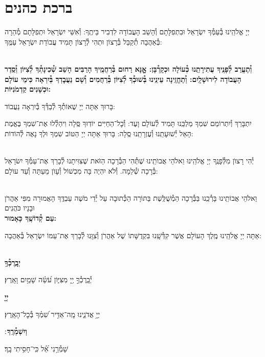 \documentclass[twoside, openany, parskip=half, 11pt]{book}
\begin{document}
\sepline

\clearpage

\vspace{-1\baselineskip}
\section[ברכת כהנים]{ ברכת כהנים ‎}
\label{birkaskohanim}

יְיָ אֱלֹהֵֽינוּ בְּ֯עַמְּ֯ךָ יִשְׂרָאֵל וּבִתְפִלָּתָם וְ֯הָשֵׁב הָעֲבוֹדָה לִדְבִיר בֵּיתֶֽךָ: וְ֯אִשֵּׁי יִשְׂרָאֵל וּתְפִלָּתָם מְ֯הֵרָה בְּ֯אַהֲבָה תְ֯קַבֵּל בְּ֯רָצוֹן וּתְהִי לְ֯רָצוֹן תָּמִיד עֲבוֹדַת יִשְׂרָאֵל עַמֶּֽךָ:

\chazzanvkahal \\
\textbf{
וְ֯תֶעֱרַב לְ֯פָנֶֽיךָ עֲתִירָתֵֽנוּ כְּ֯עוֹלָה וּכְקָרְ֯בָּן:
אׇׇׇנָּא רַחוּם בְּ֯רַחֲמֶֽיךָ הָרַבִּים הָשֵׁב שְׁ֯כִינָתְ֯ךָ לְ֯צִיּוֹן וְ֯סֵֽדֶר הָעֲבוֹדָה לִירוּשָׁלָֽיִם:
וְ֯תֶחֱזֶֽינָה עֵינֵֽינוּ בְּ֯שׁוּבְ֯ךָ לְ֯צִיּוֹן בְּ֯רַחֲמִים
וְ֯שָׁם נַעֲבׇדְךָ בְּ֯יִרְאָה כִּימֵי עוֹלָם וּכְשָׁנִים קַדְמֹנִיּוֹת:
}

\chazzan
בָּרוּךְ אַתָּה יְיָ שֶׁאוֹתְ֯ךָ לְ֯בַדְּ֯ךָ בְּ֯יִרְאָה נַעֲבוֹד:

\modim

יִתְבָּרַךְ וְ֯יִתְרוֹמַם שִׁמְךָ מַלְכֵּֽנוּ תָּמִיד לְ֯עוֹלָם וָעֶד: וְ֯כׇל־הַחַיִּים יוֹדֽוּךָ סֶּֽלָה וִיהַלְ֯לוּ אֶת־שִׁמְךָ בֶּאֱמֶת הָאֵל יְ֯שׁוּעָתֵֽנוּ וְ֯עֶזְרָתֵֽנוּ סֶֽלָה: בָּרוּךְ אַתָּה יְיָ הַטּוֹב שִׁמְךָ וּלְךָ נָאֶה לְ֯הוֹדוֹת:

\\
יְ֯הִי רָצוׂן מִלְּ֯פָנֶֽךָ יְיָ אֱלֹהֵֽינוּ וֵאלֹהֵי אֲבוׂתֵֽינוּ שֶׁתְּ֯הִי הַבְּ֯רָכָה הַזֹּאת שֶׁצִּוִּיתָנוּ לְ֯בָרֵךְ אֶת־עַמְּ֯ךָ יִשׂרָאֵל בְּ֯רָכָה שְׁ֯לֵמָה. וְ֯לֹא יִהְיֶה בָּה מִכְשׁוֹל וְ֯עָוׂן מֵעַתָּה וְ֯עַד עוׂלָם:

\\
\shatz {}
וֵאלֹהֵי אֲבוֹתֵֽינוּ בָּרְ֯כֵֽנוּ בַּבְּ֯רָכָה הַמְ֯שֻׁלֶּֽשֶׁת בַּתּוֹרָה הַכְּ֯תוּבָה עַל יְ֯דֵי מֹשֶׁה עַבְדֶּֽךָ הָאֲמוּרָה מִפִּי אַהֲרֹן וּבָנָיו כֹּהֲנִים \\
\shatzvkahal
\textbf{עַם קְ֯דוֹשֶֽׁךָ כָּאָמוּר:}

אַתָּה יְיָ אֱלֹהֵֽינוּ מֶֽלֶךְ הָעוֹלָם אֲשֶׁר קִדְּ֯שָֽׁנוּ בִּקְדֻשָּׁתוֹ שֶׁל אַהֲרֹן וְ֯צִוָּֽנוּ לְ֯בָרֵךְ אֶת־עַמּוֹ יִשְׂרָאֵל בְּ֯אַהֲבָה:


\\
\textbf{יְבָֽרֶכְ֯ךָ֥}
\hfill \begin{footnotesize}
 יְ֯בָֽרֶכְ֯ךָ֣ יְ֖יָ מִצִּיּ֑וֹן עֹ֝שֵׂ֗ה שָׁמַ֥יִם וָאָֽרֶץ׃\\
\end{footnotesize}
\textbf{יְיָ֖}
\hfill \begin{footnotesize}
 יְיָ֥ אֲדֹנֵ֑ינוּ מָֽה־אַדִּ֥יר שִׁ֝מְ֗ךָ בְּ֯כׇל־הָאָֽרֶץ׃\\
\end{footnotesize}
\textbf{וְיִשְׁמְ֯רֶֽךָ}
׃ \hfill \begin{footnotesize}
 שָׁמְ֯רֵ֥נִי אֵ֝֗ל כִּֽי־חָסִ֥יתִי בָֽךְ׃
\end{footnotesize}
\end{document}
